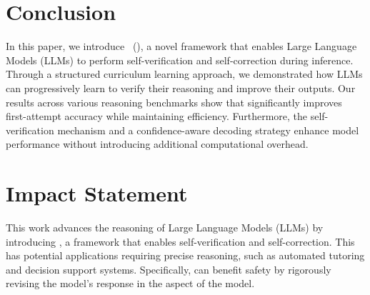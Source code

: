 \section{Conclusion}
\label{sec:con}
In this paper, we introduce \mmname\ (\sname), a novel framework that enables Large Language Models (LLMs) to perform self-verification and self-correction during inference. Through a structured curriculum learning approach, we demonstrated how LLMs can progressively learn to verify their reasoning and improve their outputs. Our results across various reasoning benchmarks show that \sname significantly improves first-attempt accuracy while maintaining efficiency. Furthermore, the self-verification mechanism and a confidence-aware decoding strategy enhance model performance without introducing additional computational overhead.

\section*{Impact Statement}

This work advances the reasoning of Large Language Models (LLMs) by introducing \mname, a framework that enables self-verification and self-correction. This has potential applications requiring precise reasoning, such as automated tutoring and decision support systems. Specifically, \sname can benefit safety by rigorously revising the model's response in the aspect of the model.
